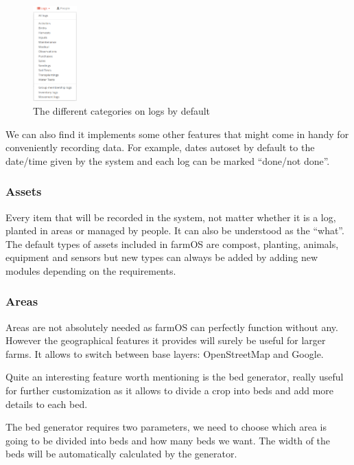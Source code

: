 \begin{figure}[htp]
    \centering
    \includegraphics[width=0.15\textwidth]{fig/logs_categories.png}
    \caption{The different categories on logs by default}
    \label{fig:logs_categories}
\end{figure}

We can also find it implements some other features that might come in handy for conveniently recording data. For example, dates autoset by default to the date/time given by the system and each log can be marked ``done/not done''.

\subsubsection{Assets}
Every item that will be recorded in the system, not matter whether it is a log, planted in areas or managed by people. It can also be understood as the ``what''. The default types of assets included in farmOS are compost, planting, animals, equipment and sensors but new types can always be added by adding new modules depending on the requirements.

\subsubsection{Areas}
Areas are not absolutely needed as farmOS can perfectly function without any. However the geographical features it provides will surely be useful for larger farms. It allows to switch between base layers: OpenStreetMap and Google.

Quite an interesting feature worth mentioning is the bed generator, really useful for further customization as it allows to divide a crop into beds and add more details to each bed.

The bed generator requires two parameters, we need to choose which area is going to be divided into beds and how many beds we want. The width of the beds will be automatically calculated by the generator.

